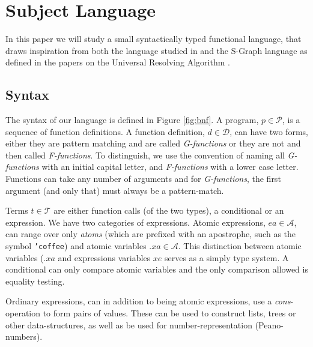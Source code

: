 \documentclass[10pt]{../sigplanconf}
\begin{document}
\section{Subject Language}
In this paper we will study a small syntactically typed functional
language, that draws inspiration from both the language studied in
\cite{sorensen1998introduction} and the S-Graph language as defined in
the papers on the Universal Resolving Algorithm
\cite{abramov2000universal, abramov2002universal,
  abramov2002principles}.

\subsection{Syntax}
The syntax of our language is defined in Figure \ref{fig:bnf}. A
program, $p \in \mathcal{P}$, is a sequence of function definitions. A
function definition, $d \in \mathcal{D}$, can have two forms, either
they are pattern matching and are called \textit{G-functions} or they
are not and then called \textit{F-functions}. To distinguish, we use
the convention of naming all \textit{G-functions} with an initial
capital letter, and \textit{F-functions} with a lower case
letter. Functions can take any number of arguments and for
\textit{G-functions}, the first argument (and only that) must always
be a pattern-match.

Terms $t \in \mathcal{T}$ are either function calls (of the two
types), a conditional or an expression. We have two categories of
expressions. Atomic expressions, $ea \in \mathcal{A}$, can range over
only \textit{atoms} (which are prefixed with an apostrophe, such as
the symbol \texttt{'coffee}) and atomic variables $\texttt{.}xa \in
\mathcal{A}$. This distinction between atomic variables
($\texttt{.}xa$ and expressions variables $xe$ serves as a simply type
system. A conditional can only compare atomic variables and the only
comparison allowed is equality testing.

Ordinary expressions, can in addition to being atomic expressions, use
a \textit{cons}-operation to form pairs of values. These can be used
to construct lists, trees or other data-structures, as well as be used
for number-representation (Peano-numbers).
\end{document}
